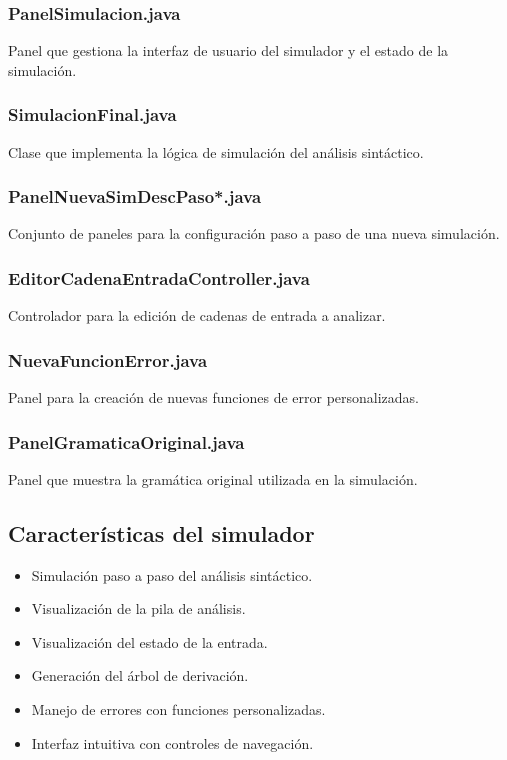 \subsubsection{PanelSimulacion.java}

Panel que gestiona la interfaz de usuario del simulador y el estado de la simulación.

\subsubsection{SimulacionFinal.java}

Clase que implementa la lógica de simulación del análisis sintáctico.

\subsubsection{PanelNuevaSimDescPaso*.java}

Conjunto de paneles para la configuración paso a paso de una nueva simulación.

\subsubsection{EditorCadenaEntradaController.java}

Controlador para la edición de cadenas de entrada a analizar.

\subsubsection{NuevaFuncionError.java}

Panel para la creación de nuevas funciones de error personalizadas.

\subsubsection{PanelGramaticaOriginal.java}

Panel que muestra la gramática original utilizada en la simulación.

\subsection{Características del simulador}

\begin{itemize}
    \item Simulación paso a paso del análisis sintáctico.
    \item Visualización de la pila de análisis.
    \item Visualización del estado de la entrada.
    \item Generación del árbol de derivación.
    \item Manejo de errores con funciones personalizadas.
    \item Interfaz intuitiva con controles de navegación.
\end{itemize}

